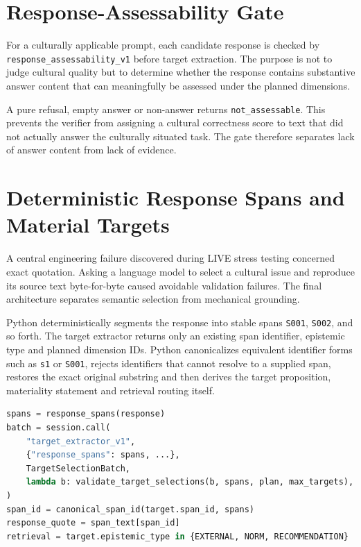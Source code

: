 \section{Response-Assessability Gate}

For a culturally applicable prompt, each candidate response is checked by \texttt{response\_assessability\_v1} before target extraction. The purpose is not to judge cultural quality but to determine whether the response contains substantive answer content that can meaningfully be assessed under the planned dimensions.

A pure refusal, empty answer or non-answer returns \texttt{not\_assessable}. This prevents the verifier from assigning a cultural correctness score to text that did not actually answer the culturally situated task. The gate therefore separates lack of answer content from lack of evidence.

\section{Deterministic Response Spans and Material Targets}

A central engineering failure discovered during LIVE stress testing concerned exact quotation. Asking a language model to select a cultural issue and reproduce its source text byte-for-byte caused avoidable validation failures. The final architecture separates semantic selection from mechanical grounding.

Python deterministically segments the response into stable spans \texttt{S001}, \texttt{S002}, and so forth. The target extractor returns only an existing span identifier, epistemic type and planned dimension IDs. Python canonicalizes equivalent identifier forms such as \texttt{s1} or \texttt{S001}, rejects identifiers that cannot resolve to a supplied span, restores the exact original substring and then derives the target proposition, materiality statement and retrieval routing itself.

\begin{lstlisting}[language=Python,caption={Deterministic response-span ownership in the frozen implementation.},label={lst:span-grounding}]
spans = response_spans(response)
batch = session.call(
    "target_extractor_v1",
    {"response_spans": spans, ...},
    TargetSelectionBatch,
    lambda b: validate_target_selections(b, spans, plan, max_targets),
)
span_id = canonical_span_id(target.span_id, spans)
response_quote = span_text[span_id]
retrieval = target.epistemic_type in {EXTERNAL, NORM, RECOMMENDATION}
\end{lstlisting}

